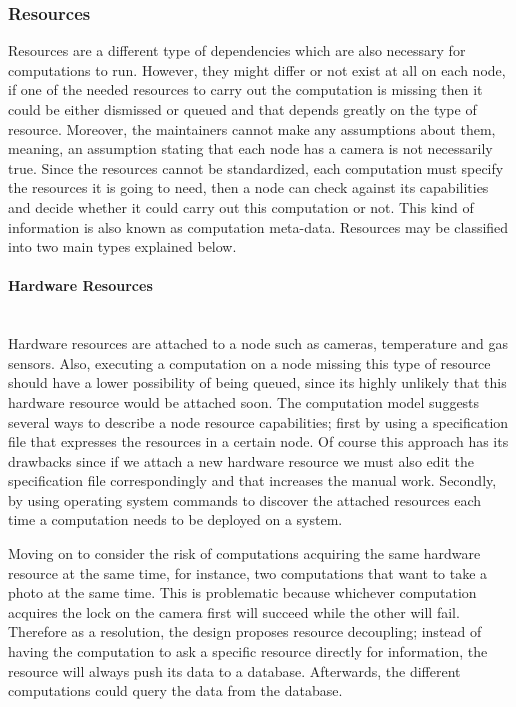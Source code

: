 \subsubsection {Resources}



Resources are a different type of dependencies which are also necessary for computations to run. However, they might differ or not exist at all on each node, if one of the needed resources to carry out the computation is missing then it could be either dismissed or queued and that depends greatly on the type of resource. Moreover, the maintainers cannot make any assumptions about them, meaning, an assumption stating that each node has a camera is not necessarily true. Since the resources cannot be standardized, each computation must specify the resources it is going to need, then a node can check against its capabilities and decide whether it could carry out this computation or not. This kind of information is also known as computation meta-data. Resources may be classified into two main types explained below.

\paragraph{Hardware Resources}\mbox{}\\

  Hardware resources  are attached to a node such as cameras, temperature and gas sensors.  Also, executing a computation on a node missing this type of resource should have a lower possibility of being queued, since its highly unlikely that this hardware resource would be attached soon. The computation model suggests several ways to describe a node resource capabilities; first by using a specification file that expresses the resources in a certain node. Of course this approach has its drawbacks since if we attach a new hardware resource we must also edit the specification file correspondingly and that increases the manual work. Secondly, by using operating system commands to discover the attached resources each time a computation needs to be deployed on a system. 
  
  Moving on to consider the risk of computations acquiring the same hardware resource at the same time, for instance, two computations that want to take a photo at the same time. This is problematic because whichever computation acquires the lock on the camera first will succeed while the other will fail. Therefore as a resolution, the design proposes resource decoupling; instead of having the computation to ask a specific resource directly for information, the resource will always push its data to a database. Afterwards, the different computations could query the data from the database.
  

